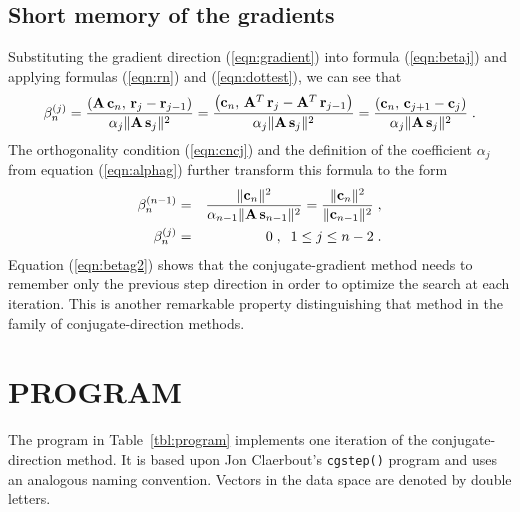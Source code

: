 \subsection{Short memory of the gradients}
Substituting the gradient direction (\ref{eqn:gradient}) into formula
(\ref{eqn:betaj}) and applying formulas (\ref{eqn:rn}) and (\ref{eqn:dottest}), we can
see that
\begin{equation}
\beta_n^{(j)} = 
{{\left({\bf A\,c}_n,\,{\bf r}_{j} - {\bf r}_{j-1}\right)} \over
{\alpha_j\|{\bf A\,s}_{j}\|^2}} =
{{\left({\bf c}_n,\,{\bf A}^T\,{\bf r}_{j} - 
{\bf A}^T\,{\bf r}_{j-1}\right)} \over
{\alpha_j\|{\bf A\,s}_{j}\|^2}} =
{{\left({\bf c}_n,\,{\bf c}_{j+1} - {\bf c}_{j}\right)} \over
{\alpha_j\|{\bf A\,s}_{j}\|^2}}\;.
\label{eqn:betag}
\end{equation} 
The orthogonality condition (\ref{eqn:cncj}) and the definition of the
coefficient $\alpha_j$ from equation (\ref{eqn:alphag}) further transform this formula 
to the form
\begin{eqnarray}
\beta_n^{(n-1)} & = &
{{\|{\bf c}_n\|^2} \over
{\alpha_{n-1}\|{\bf A\,s}_{n-1}\|^2}} =
{{\|{\bf c}_n\|^2} \over
{\|{\bf c}_{n-1}\|^2}}\;,
\label{eqn:betag1} \\
\beta_n^{(j)}  & = & 0\;,\;\;1 \leq j \leq n-2\;.
\label{eqn:betag2}
\end{eqnarray}
Equation (\ref{eqn:betag2}) shows that the conjugate-gradient method needs
to remember only the previous step direction in order to optimize the
search at each iteration. This is another remarkable property
distinguishing that method in the family of conjugate-direction
methods.

\section{PROGRAM}
The program in Table~\ref{tbl:program} implements one
iteration of the conjugate-direction method. It is based upon Jon
Claerbout's \verb!cgstep()! program \cite[]{gee} and uses an analogous
naming convention. Vectors in the data space are denoted by double
letters.

\lstset{language=c,numbers=left,numberstyle=\tiny,showstringspaces=false}




